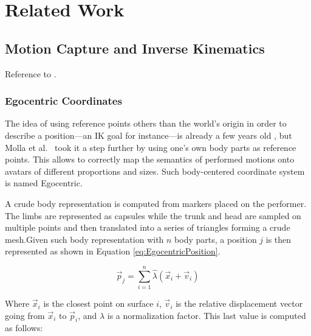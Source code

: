 
\chapter{Related Work} %

\label{Chapter2}

\section{Motion Capture and Inverse Kinematics}

Reference to \cite{molla2013singularity,molla2017egocentric}.

\subsection{Egocentric Coordinates}

The idea of using reference points others than the world's origin in order to describe a position---an IK goal for instance---is already a few years old \cite{al2013relationship}, but Molla et al.\ \cite{molla2017egocentric,molla2016precise} took it a step further by using one's own body parts as reference points. This allows to correctly map the semantics of performed motions onto avatars of different proportions and sizes. Such body-centered coordinate system is named Egocentric.

A crude body representation is computed from markers placed on the performer. The limbs are represented as capsules while the trunk and head are sampled on multiple points and then translated into a series of triangles forming a crude mesh.Given such body representation with $n$ body parts, a position $j$ is then represented as shown in Equation \ref{eq:EgocentricPosition}.

\begin{equation}
\label{eq:EgocentricPosition}
\vec{p}_j = \displaystyle\sum_{i=1}^{n} \hat{\lambda}(\vec{x}_i + \vec{v}_i)
\end{equation}

Where $\vec{x}_i$ is the closest point on surface $i$, $\vec{v}_i$ is the relative displacement vector going from $\vec{x}_i$ to $\vec{p}_i$, and $\lambda $ is a normalization factor. This last value is computed as follows:


